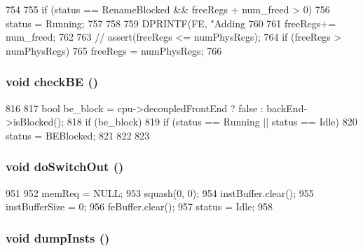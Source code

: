 \begin{DoxyCode}
754 {
755     if (status == RenameBlocked && freeRegs + num_freed > 0) {
756         status = Running;
757     }
758 
759     DPRINTF(FE, "Adding %
760 
761     freeRegs+= num_freed;
762 
763 //    assert(freeRegs <= numPhysRegs);
764     if (freeRegs > numPhysRegs)
765         freeRegs = numPhysRegs;
766 }
\end{DoxyCode}
\hypertarget{classFrontEnd_aa4296e63c1facc468b3844b89fdb1b3c}{
\subsubsection[{checkBE}]{\setlength{\rightskip}{0pt plus 5cm}void checkBE ()}}
\label{classFrontEnd_aa4296e63c1facc468b3844b89fdb1b3c}



\begin{DoxyCode}
816 {
817     bool be_block = cpu->decoupledFrontEnd ? false : backEnd->isBlocked();
818     if (be_block) {
819         if (status == Running || status == Idle) {
820             status = BEBlocked;
821         }
822     }
823 }
\end{DoxyCode}
\hypertarget{classFrontEnd_a039b639c41c289e1cfe6d71c41d9308c}{
\subsubsection[{doSwitchOut}]{\setlength{\rightskip}{0pt plus 5cm}void doSwitchOut ()}}
\label{classFrontEnd_a039b639c41c289e1cfe6d71c41d9308c}



\begin{DoxyCode}
951 {
952     memReq = NULL;
953     squash(0, 0);
954     instBuffer.clear();
955     instBufferSize = 0;
956     feBuffer.clear();
957     status = Idle;
958 }
\end{DoxyCode}
\hypertarget{classFrontEnd_a80587b4fe043bbe1995536cb3b361588}{
\subsubsection[{dumpInsts}]{\setlength{\rightskip}{0pt plus 5cm}void dumpInsts ()}}
\label{classFrontEnd_a80587b4fe043bbe1995536cb3b361588}



